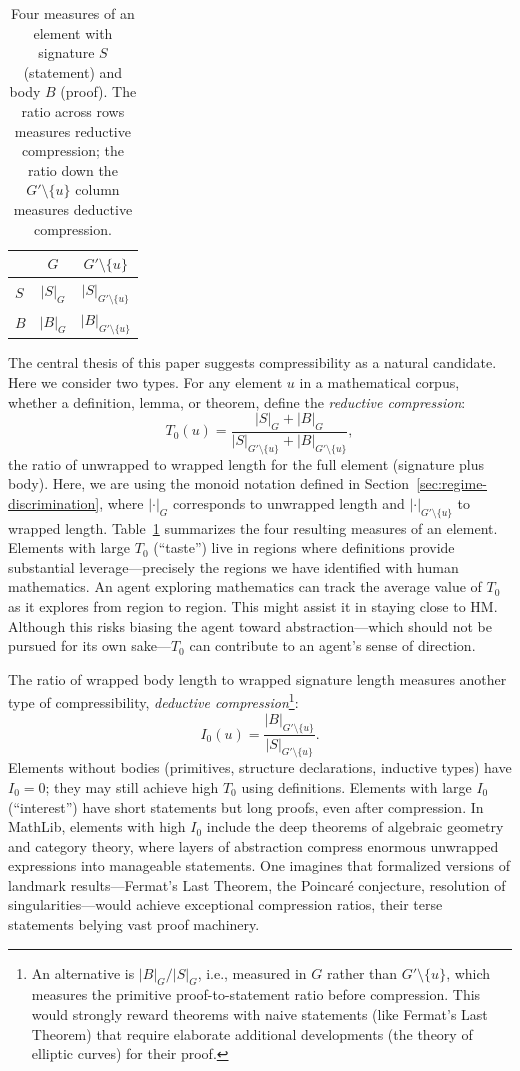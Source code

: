 \documentclass[12pt]{amsart}
\theoremstyle{definition}
\theoremstyle{remark}
\begin{document}
\begin{table}[ht]
\centering
\begin{tabular}{lcc}
\hline
 & $G$ & $G' \setminus \{u\}$ \\
\hline
$S$ & $|S|_G$ & $|S|_{G' \setminus \{u\}}$ \\
$B$ & $|B|_G$ & $|B|_{G' \setminus \{u\}}$ \\
\hline
\end{tabular}
\caption{Four measures of an element with signature $S$ (statement) and body $B$ (proof).
The ratio across rows measures reductive compression; the ratio down the $G' \setminus \{u\}$ column measures deductive compression.}
\label{tab:compression-quadrant}
\end{table}

The central thesis of this paper suggests compressibility as a natural candidate.
Here we consider two types.
For any element $u$ in a mathematical corpus, whether a definition, lemma, or theorem, define the \emph{reductive compression}:
\[
T_0(u) = \frac{|S|_G+|B|_G}{|S|_{G' \setminus \{u\}}+|B|_{G' \setminus \{u\}}},
\]
the ratio of unwrapped to wrapped length for the full element (signature plus body).
Here, we are using the monoid notation defined in Section~\ref{sec:regime-discrimination}, where $|\cdot|_G$ corresponds to unwrapped length and $|\cdot|_{G' \setminus \{u\}}$ to wrapped length.
Table~\ref{tab:compression-quadrant} summarizes the four resulting measures of an element.
Elements with large $T_0$ (``taste'') live in regions where definitions provide substantial leverage---precisely the regions we have identified with human mathematics.
An agent exploring mathematics can track the average value of $T_0$ as it explores from region to region.
This might assist it in staying close to HM.
Although this risks biasing the agent toward abstraction---which should not be pursued for its own sake---$T_0$ can contribute to an agent's sense of direction.

The ratio of wrapped body length to wrapped signature length measures another type of compressibility, \emph{deductive compression}\footnote{An alternative is $|B|_G/|S|_G$, i.e., measured in $G$ rather than $G' \setminus \{u\}$, which measures the primitive proof-to-statement ratio before compression. This would strongly reward theorems with naive statements (like Fermat's Last Theorem) that require elaborate additional developments (the theory of elliptic curves) for their proof.}:
\[
I_0(u) = \frac{|B|_{G' \setminus \{u\}}}{|S|_{G' \setminus \{u\}}}.
\]
Elements without bodies (primitives, structure declarations, inductive types) have $I_0 = 0$; they may still achieve high $T_0$ using definitions.
Elements with large $I_0$ (``interest'') have short statements but long proofs, even after compression.
In MathLib, elements with high $I_0$ include the deep theorems of algebraic geometry and category theory, where layers of abstraction compress enormous unwrapped expressions into manageable statements.
One imagines that formalized versions of landmark results---Fermat's Last Theorem, the Poincar\'e conjecture, resolution of singularities---would achieve exceptional compression ratios, their terse statements belying vast proof machinery.
\end{document}
